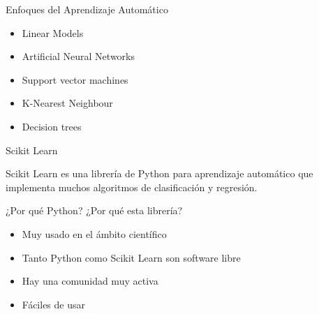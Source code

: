 \documentclass[10pt]{beamer}
\begin{document}
\begin{frame}{Enfoques del Aprendizaje Automático}


  \begin{itemize}
  \item Linear Models
  \item Artificial Neural Networks
  \item Support vector machines
  \item K-Nearest Neighbour
  \item Decision trees
  \end{itemize}

\end{frame}

\begin{frame}{Scikit Learn}

  Scikit Learn es una librería de Python para aprendizaje automático que
  implementa muchos algoritmos de clasificación y regresión.

  ¿Por qué Python? ¿Por qué esta librería?

  \begin{itemize}
  \item Muy usado en el ámbito científico
  \item Tanto Python como Scikit Learn son software libre
  \item Hay una comunidad muy activa
  \item Fáciles de usar
  \end{itemize}


\end{frame}

\end{document}
